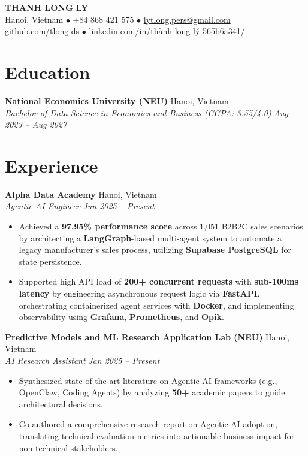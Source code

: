 \documentclass[10pt, letterpaper]{article}
\newcommand{\entryheader}[4]{
    \noindent\textbf{#1} \hfill #2 \\
    \textit{#3} \hfill \textit{#4} \par
}
\begin{document}
\pagestyle{empty}

\begin{center}
    {\LARGE \textbf{THANH LONG LY}} \\
    \vspace{4pt}
    Hanoi, Vietnam $\bullet$ +84 868 421 575 $\bullet$ \href{mailto:lytlong.pers@gmail.com}{lytlong.pers@gmail.com} \\
    \href{https://github.com/tlong-ds}{github.com/tlong-ds} $\bullet$ \href{https://www.linkedin.com/in/thành-long-lý-565b6a341/}{linkedin.com/in/thành-long-lý-565b6a341/}
\end{center}

\section{Education}
\entryheader{National Economics University (NEU)}{Hanoi, Vietnam}{Bachelor of Data Science in Economics and Business (CGPA: 3.55/4.0)}{Aug 2023 -- Aug 2027}

\section{Experience}
\entryheader{Alpha Data Academy}{Hanoi, Vietnam}{Agentic AI Engineer}{Jun 2025 -- Present}
\begin{itemize}
    \item Achieved a \textbf{97.95\% performance score} across 1,051 B2B2C sales scenarios by architecting a \textbf{LangGraph}-based multi-agent system to automate a legacy manufacturer's sales process, utilizing \textbf{Supabase PostgreSQL} for state persistence.
    \item Supported high API load of \textbf{200+ concurrent requests} with \textbf{sub-100ms latency} by engineering asynchronous request logic via \textbf{FastAPI}, orchestrating containerized agent services with \textbf{Docker}, and implementing observability using \textbf{Grafana}, \textbf{Prometheus}, and \textbf{Opik}.
\end{itemize}

\vspace{6pt}
\entryheader{Predictive Models and ML Research Application Lab (NEU)}{Hanoi, Vietnam}{AI Research Assistant}{Jan 2025 -- Present}
\begin{itemize}
    \item Synthesized state-of-the-art literature on Agentic AI frameworks (e.g., OpenClaw, Coding Agents) by analyzing \textbf{50+} academic papers to guide architectural decisions.
    \item Co-authored a comprehensive research report on Agentic AI adoption, translating technical evaluation metrics into actionable business impact for non-technical stakeholders.
\end{itemize}
\end{document}
